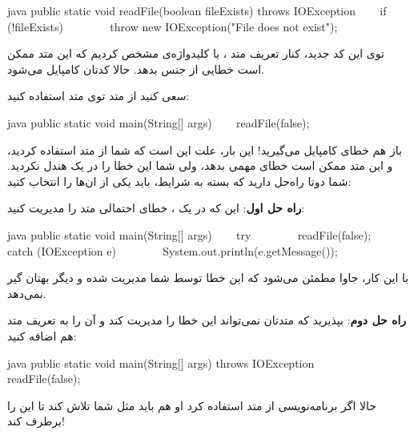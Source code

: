 \begin{codebox}{java}
public static void readFile(boolean fileExists) throws IOException {
    if (!fileExists) {
        throw new IOException("File does not exist");  
    }  
}
\end{codebox}

توی این کد جدید، کنار تعریف متد  ، با کلیدواژه‌ی
 مشخص کردیم که این متد ممکن است خطایی از جنس
 بدهد. حالا کدتان کامپایل می‌شود.

سعی کنید از متد  توی متد 
استفاده کنید:

\begin{codebox}{java}
public static void main(String[] args) {  
    readFile(false);  
}
\end{codebox}

باز هم خطای کامپایل می‌گیرید! این‌ بار، علت این است که شما از متد
 استفاده کردید، و این متد ممکن است خطای مهمی بدهد،
ولی شما این خطا را در یک  هندل نکردید. شما دوتا
راه‌حل دارید که بسته به شرایط، باید یکی از ان‌ها را انتخاب کنید:

\textbf{راه حل اول}: این که در یک  ، خطای احتمالی
متد  را مدیریت کنید:

\begin{codebox}{java}
public static void main(String[] args) {
    try {  
        readFile(false);  
    } catch (IOException e) {  
        System.out.println(e.getMessage());  
    }  
}
\end{codebox}

با این کار، جاوا مطمئن می‌شود که این خطا توسط شما مدیریت شده و دیگر بهتان
گیر نمی‌دهد.

\textbf{راه حل دوم}: بپذیرید که متدتان نمی‌تواند این خطا را مدیریت کند و
آن را به تعریف متد  هم اضافه کنید:

\begin{codebox}{java}
public static void main(String[] args) throws IOException {  
    readFile(false);  
}
\end{codebox}

حالا اگر برنامه‌نویسی از متد  استفاده کرد او هم باید
مثل شما تلاش کند تا این  را برطرف کند!

\subsubsection{}

